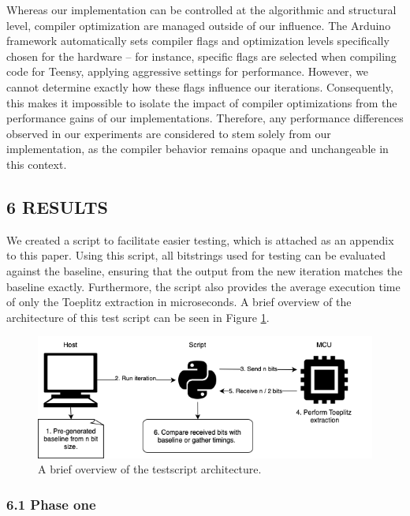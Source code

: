Whereas our implementation can be controlled at the algorithmic and structural level, compiler optimization are managed outside of our influence. The Arduino framework automatically sets compiler flags and optimization levels specifically chosen for the hardware -- for instance, specific flags are selected when compiling code for Teensy, applying aggressive settings for performance. However, we cannot determine exactly how these flags influence our iterations. Consequently, this makes it impossible to isolate the impact of compiler optimizations from the performance gains of our implementations. Therefore, any performance differences observed in our experiments are considered to stem solely from our implementation, as the compiler behavior remains opaque and unchangeable in this context.

\subsection{6 RESULTS}\label{results}

We created a script to facilitate easier testing, which is attached as an appendix to this paper. Using this script, all bitstrings used for testing can be evaluated against the baseline, ensuring that the output from the new iteration matches the baseline exactly. Furthermore, the script also provides the average execution time of only the Toeplitz extraction in microseconds. A brief overview of the architecture of this test script can be seen in Figure \ref{fig:testscript-architecture}.

\begin{figure}[!t] \centering
\includegraphics[width=\textwidth]{img/testscript.png} \caption{A brief overview
of the testscript architecture.} \label{fig:testscript-architecture}
\end{figure}

\subsubsection{6.1 Phase one}\label{phase-one-1}

